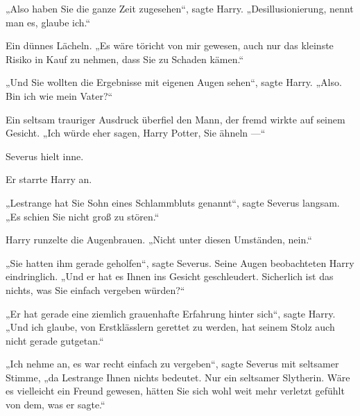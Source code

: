 „Also haben Sie die ganze Zeit zugesehen“, sagte Harry.
„Desillusionierung, nennt man es, glaube ich.“

Ein dünnes Lächeln.
„Es wäre töricht von mir gewesen, auch nur das kleinste Risiko in Kauf zu nehmen, dass Sie zu Schaden kämen.“

„Und Sie wollten die Ergebnisse mit eigenen Augen sehen“, sagte Harry.
„Also. Bin ich wie mein Vater?“

Ein seltsam trauriger Ausdruck überfiel den Mann, der fremd wirkte auf seinem Gesicht.
„Ich würde eher sagen, Harry Potter, Sie ähneln —“

Severus hielt inne.

Er starrte Harry an.

„Lestrange hat Sie Sohn eines Schlammbluts genannt“, sagte Severus langsam.
„Es schien Sie nicht groß zu stören.“

Harry runzelte die Augenbrauen.
„Nicht unter diesen Umständen, nein.“

„Sie hatten ihm gerade geholfen“, sagte Severus. Seine Augen beobachteten Harry eindringlich.
„Und er hat es Ihnen ins Gesicht geschleudert. Sicherlich ist das nichts, was Sie einfach vergeben würden?“

„Er hat gerade eine ziemlich grauenhafte Erfahrung hinter sich“, sagte Harry.
„Und ich glaube, von Erstklässlern gerettet zu werden, hat seinem Stolz auch nicht gerade gutgetan.“

„Ich nehme an, es war recht einfach zu vergeben“, sagte Severus mit seltsamer Stimme, „da Lestrange Ihnen nichts bedeutet. Nur ein seltsamer Slytherin. Wäre es vielleicht ein Freund gewesen, hätten Sie sich wohl weit mehr verletzt gefühlt von dem, was er sagte.“

